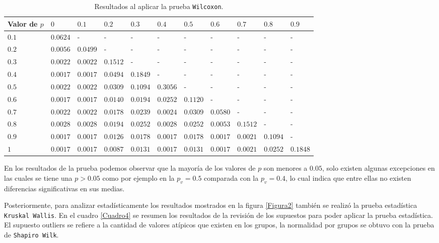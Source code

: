 \documentclass{article}
\begin{document}
\begin{table}[ht]
\centering
\caption{Resultados al aplicar la prueba \texttt{Wilcoxon}.}
\smallskip

\begin{tabular}{|p{1.7cm}|p{1cm}|p{1cm}|p{1cm}|p{1cm}|p{1cm}|p{1cm}|p{1cm}|p{1cm}|p{1cm}|p{1cm}|}
 \hline
Valor de $p$ & $0$ & $0.1$ & $0.2$ & $0.3$ & $0.4$ & $0.5$ & $0.6$ & $0.7$ & $0.8$ & $0.9$\\
 \hline
 $0.1$ & $0.0624$ & - & - & - & - & - & - & - & - & -\\
 \hline
 $0.2$ & $0.0056$ & $0.0499$ & - & - & - & - & - & - & - & -\\
 \hline
 $0.3$ & $0.0022$ & $0.0022$ & $0.1512$ & - & - & - & - & - & - & - \\
 \hline
 $0.4$ & $0.0017$ & $0.0017$ & $0.0494$ & $0.1849$ & - & - & - & - & - & - \\
 \hline
 $0.5$ & $0.0022$ & $0.0022$ & $0.0309$ & $0.1094$ & $0.3056$ & - & - & - & - & - \\
 \hline
 $0.6$ & $0.0017$ & $0.0017$ & $0.0140$ & $0.0194$ & $0.0252$ & $0.1120$ & - & - & - & - \\
 \hline
 $0.7$ & $0.0022$ & $0.0022$ & $0.0178$ & $0.0239$ & $0.0024$ & $0.0309$ & $0.0580$ & - & - & - \\
 \hline
 $0.8$ & $0.0028$ & $0.0028$ & $0.0194$ & $0.0252$ & $0.0028$ & $0.0252$ & $0.0053$ & $0.1512$ & - & - \\
 \hline
 $0.9$ & $0.0017$ & $0.0017$ & $0.0126$ & $0.0178$ & $0.0017$ & $0.0178$ & $0.0017$ & $0.0021$ & $0.1094$ & - \\
 \hline
 $1$ & $0.0017$ & $0.0017$ & $0.0087$ & $0.0131$ & $0.0017$ & $0.0131$ & $0.0017$ & $0.0021$ & $0.0252$ & $0.1848$ \\
 \hline
\end{tabular}
\label{Cuadro3}
\end{table}

En los resultados de la prueba podemos observar que la mayoría de los valores de $p$ son menores a $0.05$, solo existen algunas excepciones en las cuales se tiene una $p > 0.05$ como por ejemplo en la $p_v = 0.5$ comparada con la $p_v = 0.4$, lo cual indica que entre ellas no existen diferencias significativas en sus medias.
\bigskip

Posteriormente, para analizar estadísticamente los resultados mostrados en la figura \ref{Figura2} también se realizó la prueba estadística \texttt{Kruskal Wallis}. En el cuadro \ref{Cuadro4} se  resumen los resultados de la revisión de los supuestos para poder aplicar la prueba estadística. El supuesto outliers se refiere a la cantidad de valores atípicos que existen en los grupos, la normalidad por grupos se obtuvo con la prueba de \texttt{Shapiro Wilk}.
\newpage
\end{document}
